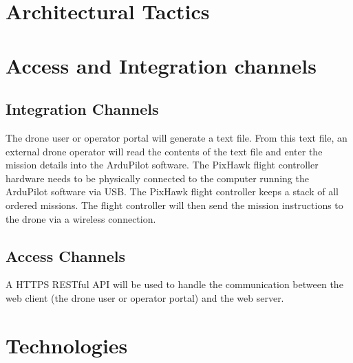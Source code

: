 \documentclass{article}
\begin{document}
	\section{Architectural Tactics}%
	\section{Access and Integration channels}%
	\subsection{Integration Channels}
	The drone user or operator portal will generate a text file. From this text file, an external drone operator will read the contents of the text file and enter the mission details into the ArduPilot software. The PixHawk flight controller hardware needs to be physically connected to the computer running the ArduPilot software via USB. The PixHawk flight controller keeps a stack of all ordered missions. The flight controller will then send the mission instructions to the drone via a wireless connection.
	\subsection{Access Channels}
	A HTTPS RESTful API will be used to handle the communication between the web client (the drone user or operator portal) and the web server. 
	\section{Technologies}%
	
	
	
	
	
	
\end{document}

